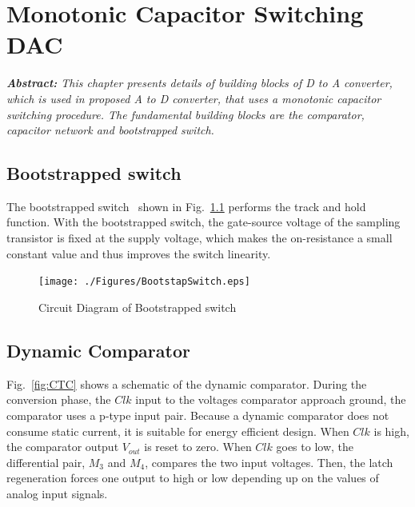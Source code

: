 \chapter{Monotonic Capacitor Switching DAC}


\textit{\textbf{Abstract:} This chapter presents details of building blocks of D to A converter, which is used in proposed A to D converter, that uses a monotonic capacitor switching procedure. The fundamental building blocks are the comparator, capacitor network and bootstrapped switch.} 


\section{Bootstrapped switch}

\par
\hspace{1.2cm} The bootstrapped switch~\cite{760369} shown in Fig.~\ref{fig:BSS} performs the track and hold function. With the bootstrapped switch, the gate-source voltage of the sampling transistor is fixed at the supply voltage, which makes the on-resistance a small constant value and thus improves the switch linearity.

\begin{figure}[ht]
	\begin{center}
		\texttt{[image: ./Figures/BootstapSwitch.eps]}
		\caption{Circuit Diagram of Bootstrapped switch}
		\label{fig:BSS}
	\end{center}
\end{figure}


\section{Dynamic Comparator}

\par
\hspace{1.2cm} Fig.~\ref{fig:CTC} shows a schematic of the dynamic comparator. During the conversion phase, the $Clk$ input to the voltages comparator approach ground, the comparator uses a p-type input pair. Because a dynamic comparator does not consume static current, it is suitable for energy efficient design. When $Clk$ is high, the comparator output $V_{out}$ is reset to zero. When $Clk$ goes to low, the differential pair, $M_{3}$ and $M_{4}$, compares the two input voltages. Then, the latch regeneration forces one output to high or low depending up on the values of analog input signals. 

